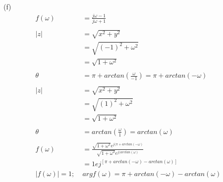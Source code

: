 \documentclass{article}
\begin{document}
(f)
\begin{equation*}
\begin{split}
    f(\omega) &= \frac{j\omega-1}{j\omega + 1}\\\\
    |z| &= \sqrt{x^2 + y^2}\\
    &= \sqrt{(-1)^2 + \omega^2}\\
    &= \sqrt{1 + \omega^2}\\\\
    \theta &= \pi + arctan(\frac{\omega}{-1}) = \pi + arctan(-\omega)\\\\
    |z| &= \sqrt{x^2 + y^2}\\
    &= \sqrt{(1)^2 + \omega^2}\\
    &= \sqrt{1 + \omega^2}\\\\
    \theta &= arctan(\frac{\omega}{1}) = arctan(\omega)\\\\
    f(\omega) &= \frac{\sqrt{1 + \omega^2}e^{j(\pi + arctan(-\omega)}}{\sqrt{1 + \omega^2}e^{j(arctan(\omega)}}\\
    &= 1 e j^{[\pi + arctan(-\omega) - arctan(\omega)]}\\
    |f(\omega)| = 1; \; & argf(\omega) = \pi + arctan(-\omega) - arctan(\omega)
\end{split}
\end{equation*}
\end{document}
